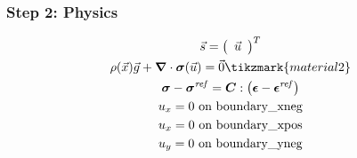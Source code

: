 \documentclass[aspectratio=169]{beamer}
\begin{document}
\begin{frame}
  \frametitle{Step 2: Physics}
  \summary{}

  \begin{minipage}{0.3\textwidth}
    {\scriptsize
    \begin{gather*}
    \vec{s} = \left(\begin{array}{c} \vec{u} \end{array}\right)^T \\
    \rho(\vec{x}) \vec{g} + \tensor{\nabla} \cdot \tensor{\sigma}(\vec{u}) = \vec{0} \tikzmark{material2}\\
    \tensor{\sigma} - \tensor{\sigma}^\mathit{ref} = \tensor{C} : \left(\tensor{\epsilon}-\tensor{\epsilon}^\mathit{ref}\right) \\
    u_x = 0 \text{ on boundary\_xneg} \\
    u_x = 0 \text{ on boundary\_xpos} \\
    u_y = 0 \text{ on boundary\_yneg} \\
    \end{gather*}}
  \end{minipage}
  \hfill
  \begin{minipage}{0.67\textwidth}
  \end{minipage}
      
\end{frame}
\end{document}
